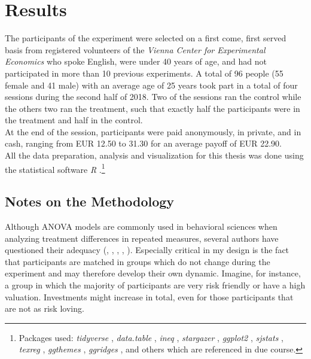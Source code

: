 \chapter{Results}
\label{ch:results}
\thispagestyle{fancy}

The participants of the experiment were selected on a first come, first served basis from registered volunteers of the \textit{Vienna Center for Experimental Economics} who spoke English, were under 40 years of age, and had not participated in more than 10 previous experiments. A total of 96 people (55 female and 41 male) with an average age of 25 years took part in a total of four sessions during the second half of 2018. Two of the sessions ran the control while the others two ran the treatment, such that exactly half the participants were in the treatment and half in the control.\\

At the end of the session, participants were paid anonymously, in private, and in cash, ranging from EUR 12.50 to 31.30 for an average payoff of EUR 22.90.\\  %

All the data preparation, analysis and visualization for this thesis was done using the statistical software \textit{R} \citep{rcoreteam2014}.\footnote{Packages used: \textit{tidyverse} \citep{wickham2017b}, \textit{data.table} \citep{dowle2018}, \textit{ineq} \citep{zeileis2014}, \textit{stargazer} \citep{hlavac2018}, \textit{ggplot2} \citep{wickham2016}, \textit{sjstats} \citep{ludecke2018}, \textit{texreg} \citep{leifeld2013}, \textit{ggthemes} \citep{arnold2018}, \textit{ggridges} \citep{wilke2018}, and others which are referenced in due course.} 

\section{Notes on the Methodology}

Although ANOVA models are commonly used in behavioral sciences when analyzing treatment differences in repeated measures, several authors have questioned their adequacy (\cite{camilli1987}, \cite{vasey1987}, \cite{jaeger2008}, \cite{locker2007}, \cite{krueger2004}). Especially critical in my design is the fact that participants are matched in groups which do not change during the experiment and may therefore develop their own dynamic. Imagine, for instance, a group in which the majority of participants are very risk friendly or have a high valuation. Investments might increase in total, even for those participants that are not as risk loving.\\ 
    
